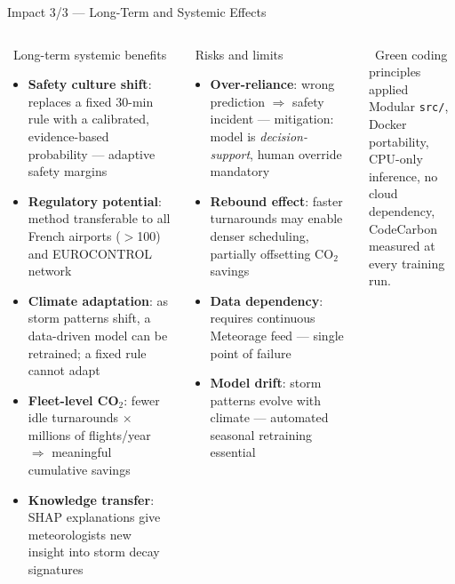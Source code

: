 \documentclass[aspectratio=169,10pt]{beamer}
\begin{document}
\begin{frame}{Impact 3/3 --- Long-Term and Systemic Effects}
  \begin{columns}[T]
      \begin{block}{\faGlobe\ Long-term systemic benefits}
        \begin{itemize}
          \item \textbf{Safety culture shift}: replaces a fixed
                30-min rule with a calibrated, evidence-based
                probability --- adaptive safety margins
          \item \textbf{Regulatory potential}: method transferable
                to all French airports ($>$100) and EUROCONTROL
                network
          \item \textbf{Climate adaptation}: as storm patterns shift,
                a data-driven model can be retrained;
                a fixed rule cannot adapt
          \item \textbf{Fleet-level CO$_2$}: fewer idle
                turnarounds $\times$ millions of flights/year
                $\Rightarrow$ meaningful cumulative savings
          \item \textbf{Knowledge transfer}: SHAP explanations
                give meteorologists new insight into
                storm decay signatures
        \end{itemize}
      \end{block}
      \begin{alertblock}{\faExclamationTriangle\ Risks and limits}
        \begin{itemize}
          \item \textbf{Over-reliance}: wrong prediction $\Rightarrow$
                safety incident --- mitigation: model is
                \emph{decision-support}, human override mandatory
          \item \textbf{Rebound effect}: faster turnarounds may
                enable denser scheduling, partially offsetting
                CO$_2$ savings
          \item \textbf{Data dependency}: requires continuous
                Meteorage feed --- single point of failure
          \item \textbf{Model drift}: storm patterns evolve with
                climate --- automated seasonal retraining essential
        \end{itemize}
      \end{alertblock}
      \vspace{4pt}
      \begin{exampleblock}{\faSeedling\ Green coding principles applied}
        Modular \texttt{src/}, Docker portability,\\
        CPU-only inference, no cloud dependency,\\
        CodeCarbon measured at every training run.
      \end{exampleblock}
  \end{columns}
\end{frame}
\end{document}
